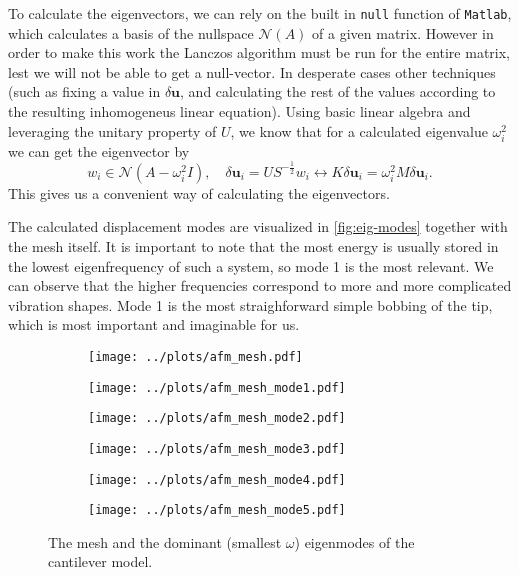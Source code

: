 \documentclass{article}
\begin{document}
To calculate the eigenvectors, we can rely on the built in \texttt{null} function of \texttt{Matlab}, which calculates a basis of the nullspace $\mathcal{N}(A)$ of a given matrix. However in order to make this work the Lanczos algorithm must be run for the entire matrix, lest we will not be able to get a null-vector. In desperate cases other techniques (such as fixing a value in $\delta\textbf{u}$, and calculating the rest of the values according to the resulting inhomogeneus linear equation). Using basic linear algebra and leveraging the unitary property of $U$, we know that for a calculated eigenvalue $\omega_i^2$ we can get the eigenvector by  
\begin{equation}
	w_i \in \mathcal{N}(A-\omega_i^2 I), \quad \delta \textbf{u}_i = U S^{-\frac{1}{2}} w_i  \leftrightarrow K \delta \textbf{u}_i = \omega_i^2 M \delta \textbf{u}_i. 
\end{equation}
This gives us a convenient way of calculating the eigenvectors.

The calculated displacement modes are visualized in \autoref{fig:eig-modes} together with the mesh itself. It is important to note that the most energy is usually stored in the lowest eigenfrequency of such a system, so mode 1 is the most relevant. 
We can observe that the higher frequencies correspond to more and more complicated vibration shapes. Mode 1 is the most straighforward simple bobbing of the tip, which is most important and imaginable for us.

\begin{figure}[h!]
	\centering
	\begin{subfigure}{0.35\textheight}
		\centering
		\texttt{[image: ../plots/afm\_mesh.pdf]}
	\end{subfigure}
	\begin{subfigure}{0.35\textheight}
		\centering
		\texttt{[image: ../plots/afm\_mesh\_mode1.pdf]}
	\end{subfigure}
	
	\begin{subfigure}{0.35\textheight}
		\centering
		\texttt{[image: ../plots/afm\_mesh\_mode2.pdf]}
	\end{subfigure}\begin{subfigure}{0.35\textheight}
	\centering
	\texttt{[image: ../plots/afm\_mesh\_mode3.pdf]}
	\end{subfigure}
	
	\begin{subfigure}{0.35\textheight}
		\centering
		\texttt{[image: ../plots/afm\_mesh\_mode4.pdf]}
	\end{subfigure}\begin{subfigure}{0.35\textheight}
	\centering
	\texttt{[image: ../plots/afm\_mesh\_mode5.pdf]}
	\end{subfigure}
	
	\caption{The mesh and the dominant (smallest $\omega$) eigenmodes of the cantilever model.}\label{fig:eig-modes}
\end{figure}

\FloatBarrier
\newpage
\printbibliography
\end{document}
